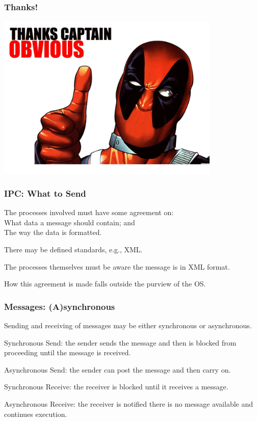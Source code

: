 \begin{frame}
\frametitle{Thanks!}

\begin{center}
	\includegraphics[width=0.8\textwidth]{images/thanks-captain-obvious}
\end{center}


\end{frame}


\begin{frame}
\frametitle{IPC: What to Send}

The processes involved must have some agreement on:\\
\quad What data a message should contain; and\\
\quad The way the data is formatted. 

There may be defined standards, e.g., XML.

The processes themselves must be aware the message is in XML format. 

How this agreement is made falls outside the purview of the OS.

\end{frame}

\begin{frame}
\frametitle{Messages: (A)synchronous}

Sending and receiving of messages may be either synchronous or asynchronous. 

Synchronous Send: the sender sends the message and then is blocked from proceeding until the message is received. 

Asynchronous Send: the sender can post the message and then carry on. 

Synchronous Receive: the receiver is blocked until it receives a message. 

Asynchronous Receive: the receiver is notified there is no message available and continues execution.

\end{frame}

